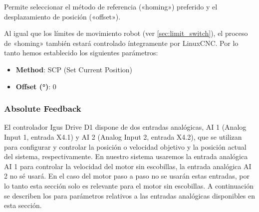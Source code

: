\documentclass[english,spanish,a4paper,11pt]{article}
\begin{document}
Permite seleccionar el método de referencia («homing») preferido y el  desplazamiento de posición («offset»).

Al igual que los límites de movimiento robot (ver \cref{sec:limit_switch}), el proceso de «homing» también estará controlado íntegramente por LinuxCNC. Por lo tanto hemos establecido los siguientes parámetros:

\begin{itemize}
    \item \textbf{Method}: SCP (Set Current Position)
    \item \textbf{Offset (\unit{\degree})}: 0
\end{itemize}


\subsubsection{Absolute Feedback}
\label{sec:axis_absolute_feedback}

El controlador Igus Drive D1 dispone de dos entradas analógicas, AI 1 (Analog Input 1, entrada X4.1) y AI 2 (Analog Input 2, entrada X4.2), que se utilizan para configurar y controlar la posición o velocidad objetivo y la posición actual del sistema, respectivamente. En nuestro sistema usaremos la entrada analógica AI 1 para controlar la velocidad del motor sin escobillas, la entrada analógica AI 2 no sé usará. En el caso del motor paso a paso no se usarán estas entradas, por lo tanto esta sección solo es relevante para el motor sin escobillas. A continuación se describen los para parámetros relativos a las entradas analógicas disponibles en esta sección.
\end{document}

